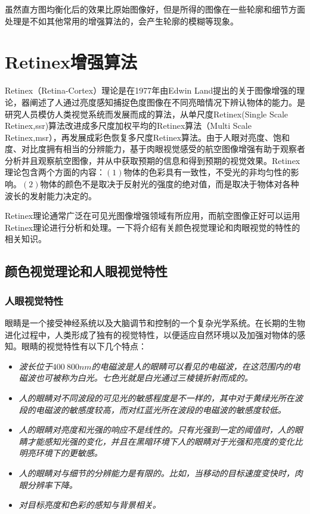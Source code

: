 \documentclass[12pt]{book}
\begin{document}
虽然直方图均衡化后的效果比原始图像好，但是所得的图像在一些轮廓和细节方面处理是不如其他常用的增强算法的，会产生轮廓的模糊等现象。
		\section{Retinex增强算法}	Retinex（Retina-Cortex）理论是在1977年由Edwin Land提出的关于图像增强的理论，器阐述了人通过亮度感知捕捉色度图像在不同亮暗情况下辨认物体的能力。是研究人员模仿人类视觉系统而发展而成的算法，从单尺度Retinex(Single Scale Retinex,ssr)算法改进成多尺度加权平均的Retinex算法（Multi Scale Retinex,msr），再发展成彩色恢复多尺度Retinex算法。由于人眼对亮度、饱和度、对比度拥有相当的分辨能力，基于肉眼视觉感受的航空图像增强有助于观察者分析并且观察航空图像，并从中获取预期的信息和得到预期的视觉效果。Retinex理论包含两个方面的内容：$(1)$物体的色彩具有一致性，不受光的非均匀性的影响。$(2)$物体的颜色不是取决于反射光的强度的绝对值，而是取决于物体对各种波长的发射能力决定的。

Retinex理论通常广泛在可见光图像增强领域有所应用，而航空图像正好可以运用Retinex理论进行分析和处理。一下将介绍有关颜色视觉理论和肉眼视觉的特性的相关知识。
			\subsection{颜色视觉理论和人眼视觉特性}
				\subsubsection{人眼视觉特性}眼睛是一个接受神经系统以及大脑调节和控制的一个复杂光学系统。在长期的生物进化过程中，人类形成了独有的视觉特性，以便适应自然环境以及加强对物体的感知。眼睛的视觉特性有以下几个特点：
				\begin{itemize}
					\item \emph{波长位于$400~800nm$的电磁波是人的眼睛可以看见的电磁波，在这范围内的电磁波也可被称为白光。七色光就是白光通过三棱镜折射而成的。}
					\item \emph{人的眼睛对不同波段的可见光的敏感程度是不一样的，其中对于黄绿光所在波段的电磁波的敏感度较高，而对红蓝光所在波段的电磁波的敏感度较低。}
					\item \emph{人的眼睛对亮度和光强的响应不是线性的。只有光强到一定的阈值时，人的眼睛才能感知光强的变化，并且在黑暗环境下人的眼睛对于光强和亮度的变化比明亮环境下的更敏感。}
					\item \emph{人的眼睛对与细节的分辨能力是有限的。比如，当移动的目标速度变快时，肉眼分辨率下降。}
					\item \emph{对目标亮度和色彩的感知与背景相关。}
				\end{itemize}
\end{document}
